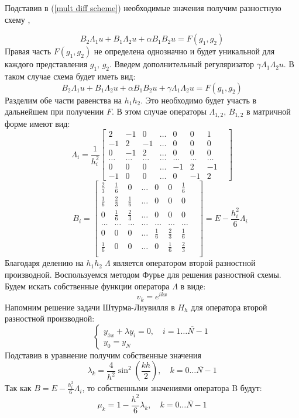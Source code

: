 \documentclass{article}
\begin{document}
Подставив в (\ref{mult diff scheme}) необходимые значения получим разностную схему \cite{marchuck}, \cite{vatiational_base}

\begin{equation}
B_2 \Lambda_1 u + B_1 \Lambda_2 u + \alpha B_1 B_2 u = F(g_1,g_2)
\end{equation}
Правая часть $F(g_1,g_2)$ не определена однозначно и будет уникальной для каждого представления $g_1,\,g_2$.
Введем дополнительный регуляризатор $\gamma\Lambda_1\Lambda_2u$. В таком случае схема будет иметь вид:
\begin{equation}\label{scheme}
B_2 \Lambda_1 u + B_1 \Lambda_2 u + \alpha B_1 B_2 u + \gamma\Lambda_1\Lambda_2u = F(g_1,g_2)
\end{equation}
Разделим обе части равенства на $h_1h_2$. Это необходимо будет участь в дальнейшем при получении $F$.
В этом случае операторы $\Lambda_{1,2},\,B_{1,2}$ в матричной форме имеют вид:
$$\Lambda_i = \frac{1}{h_i^2}
\begin{bmatrix}
2 & -1 & 0 & \ldots & 0 & 0 & 1\\
-1 & 2 & -1 & \ldots & 0 & 0 & 0\\
0 & -1 & 2 & \ldots &0 & 0 & 0\\
\ldots & \ldots & \ldots & \ldots & \ldots & \ldots & \ldots &\\
0 & 0 & 0 & \ldots & -1 & 2 & -1\\
-1 & 0 & 0 & \ldots & 0 & -1 & 2
\end{bmatrix}
$$
$$
\qquad B_i = 
\begin{bmatrix}
\frac{2}{3} & \frac{1}{6} & 0 & \ldots & 0 & 0 & \frac{1}{6}\\
\frac{1}{6} & \frac{2}{3} & \frac{1}{6} & \ldots & 0 & 0 & 0\\
0 & \frac{1}{6} & \frac{2}{3} & \ldots &0 & 0 & 0\\
\ldots & \ldots & \ldots & \ldots & \ldots & \ldots & \ldots &\\
0 & 0 & 0 & \ldots & \frac{1}{6} & \frac{2}{3} & \frac{1}{6}\\
\frac{1}{6} & 0 & 0 & \ldots & 0 & \frac{1}{6} & \frac{2}{3} \\
\end{bmatrix} = E - \frac{h_i^2}{6}\Lambda_i$$
Благодаря делению на $h_1h_2\;\Lambda$ является оператором второй разностной производной.
Воспользуемся методом Фурье для решения разностной схемы. Будем искать собственные функции оператора $\Lambda$ в виде:
$$v_k = e^{ikx}$$
Напомним решение задачи Штурма-Лиувилля в $H_h$ для оператора второй разностной производной:
$$\begin{cases}
y_{\overline{x}x} + \lambda y_i = 0,\quad i = \overline{1\ldots N-1} \\
y_0 = y_N
\end{cases}$$
Подставив в уравнение получим собственные значения 
$$
\lambda_k = \frac{4}{h^2} \sin^2(\frac{kh}{2}),\quad k = \overline{0 \ldots N-1}
$$
Так как $B = E - \frac{h_i^2}{6}\Lambda_i$, то собственными значениями оператора B будут:
$$
\mu_k = 1 - \frac{h^2}{6}\lambda_k,\quad k = \overline{0 \ldots N-1}
$$
\end{document}
